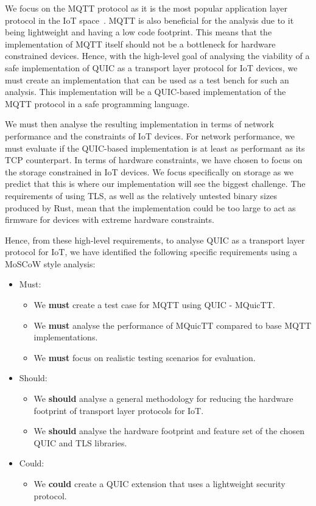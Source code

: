 We focus on the MQTT protocol as it is the most popular application layer protocol in the IoT space~\citep{tmobile_iot}.
MQTT is also beneficial for the analysis due to it being lightweight and having a low code footprint.
This means that the implementation of MQTT itself should not be a bottleneck for hardware constrained devices.
Hence, with the high-level goal of analysing the viability of a safe implementation of QUIC as a transport layer protocol for IoT devices, we must create an implementation that can be used as a test bench for such an analysis.
This implementation will be a QUIC-based implementation of the MQTT protocol in a safe programming language.

We must then analyse the resulting implementation in terms of network performance and the constraints of IoT devices.
For network performance, we must evaluate if the QUIC-based implementation is at least as performant as its TCP counterpart.
In terms of hardware constraints, we have chosen to focus on the storage constrained in IoT devices.
We focus specifically on storage as we predict that this is where our implementation will see the biggest challenge.
The requirements of using TLS, as well as the relatively untested binary sizes produced by Rust, mean that the implementation could be too large to act as firmware for devices with extreme hardware constraints.

Hence, from these high-level requirements, to analyse QUIC as a transport layer protocol for IoT, we have identified the following specific requirements using a MoSCoW style analysis:

\begin{itemize}
    \item Must:
    \begin{itemize}
        \item We \textbf{must} create a test case for MQTT using QUIC - MQuicTT.
        \item We \textbf{must} analyse the performance of MQuicTT compared to base MQTT implementations.
        \item We \textbf{must} focus on realistic testing scenarios for evaluation.
    \end{itemize}
    \item Should:
    \begin{itemize}
        \item We \textbf{should} analyse a general methodology for reducing the hardware footprint of transport layer protocols for IoT.
        \item We \textbf{should} analyse the hardware footprint and feature set of the chosen QUIC and TLS libraries.
    \end{itemize}
    \item Could:
    \begin{itemize}
        \item We \textbf{could} create a QUIC extension that uses a lightweight security protocol.
    \end{itemize}
\end{itemize}

